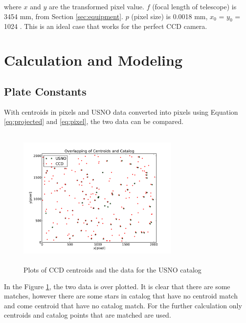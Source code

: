 \documentclass[a4paper,12pt]{article}
\begin{document}
where $x$ and $y$ are the transformed pixel value. $f$  (focal length of telescope) is 3454 mm, from Section \ref{sec:equipment}. $p$ (pixel size) is 0.0018 mm, $x_0$ = $y_0$ = 1024 \cite{instructions}. This is an ideal case that works for the perfect CCD camera. 

\section{Calculation and Modeling}
\label{sec:calc}

\subsection{Plate Constants}
\label{sec:plate}

With centroids in pixels and USNO data converted into pixels using Equation \ref{eq:projected} and \ref{eq:pixel}, the two data can be compared. 

\begin{figure}[H]
	\centering
	\includegraphics[angle=0,height=7cm,width=8cm]{galaxy/Overlapping.pdf}
	\caption{Plots of CCD centroids and the data for the USNO catalog}
	\label{fig:match}
\end{figure} 
In the Figure \ref{fig:match}, the two data is over plotted. It is clear that there are some matches, however there are some stars in catalog that have no centroid match and come centroid that have no catalog match. For the further calculation only centroids and catalog points that are matched are used.  
\end{document}
